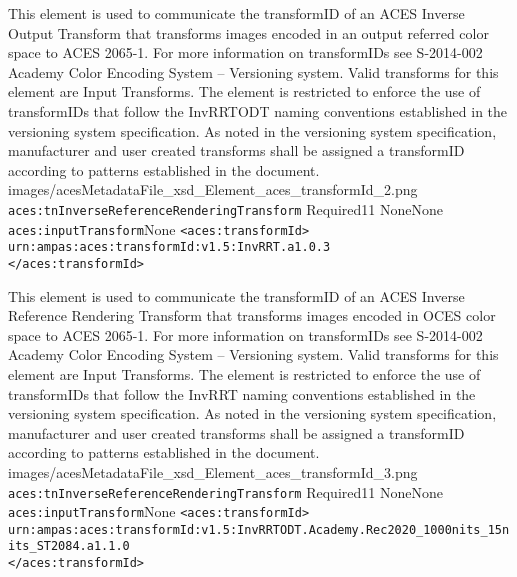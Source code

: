         {This element is used to communicate the transformID of an ACES Inverse Output Transform that transforms images encoded in an output referred color space to ACES 2065-1.  For more information on transformIDs see S-2014-002 Academy Color Encoding System -- Versioning system.  Valid transforms for this element are Input Transforms.  The element is restricted to enforce the use of transformIDs that follow the InvRRTODT naming conventions established in the versioning system specification.  As noted in the versioning system specification, manufacturer and user created transforms shall be assigned a transformID according to patterns established in the document.}
        {images/acesMetadataFile_xsd_Element_aces_transformId_2.png}
        {\texttt{aces:tnInverseReferenceRenderingTransform}}
        {Required}{1}{1}
        {None}{None}
        {\texttt{aces:inputTransform}}{None}
        {\lstinline{<aces:transformId>}\\
        \lstinline{urn:ampas:aces:transformId:v1.5:InvRRT.a1.0.3}\\
        \lstinline{</aces:transformId>}}

        {This element is used to communicate the transformID of an ACES Inverse Reference Rendering Transform that transforms images encoded in OCES color space to ACES 2065-1.  For more information on transformIDs see S-2014-002 Academy Color Encoding System -- Versioning system.  Valid transforms for this element are Input Transforms.  The element is restricted to enforce the use of transformIDs that follow the InvRRT naming conventions established in the versioning system specification.  As noted in the versioning system specification, manufacturer and user created transforms shall be assigned a transformID according to patterns established in the document.}
        {images/acesMetadataFile_xsd_Element_aces_transformId_3.png}
        {\texttt{aces:tnInverseReferenceRenderingTransform}}
        {Required}{1}{1}
        {None}{None}
        {\texttt{aces:inputTransform}}{None}
        {\lstinline{<aces:transformId>} \\
        \lstinline{urn:ampas:aces:transformId:v1.5:InvRRTODT.Academy.Rec2020_1000nits_15nits_ST2084.a1.1.0}\\
        \lstinline{</aces:transformId>}}
  
